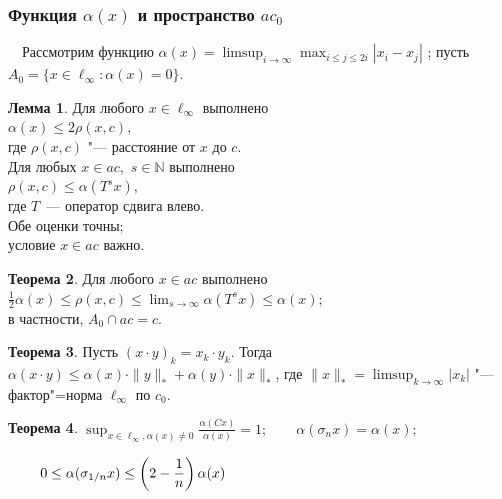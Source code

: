 \documentclass[10pt,pdf,hyperref={unicode},aspectratio=169,color={usenames, dvipsnames}]{beamer}
\theoremstyle{definition}
\newtheorem{llemma}{Лемма}
\newtheorem{ttheorem}[llemma]{Теорема}
\begin{document}
\begin{frame}
	\frametitle{Функция $\alpha(x)$ и пространство $ac_0$}

	\vspace{0.9em}
	~~Рассмотрим функцию
	$\displaystyle
		\alpha(x) = \limsup_{i\to\infty} \max_{i \leq j \leq 2i} |x_i-x_j|
	$
	; пусть
	$
		A_0 = \{x\in\ell_\infty : \alpha(x) = 0\}
	$.


	\begin{varwidth}[t]{0.47\linewidth}
		\begin{llemma}
			Для любого $x\in\ell_\infty$
			выполнено
			\\\phantom{centering}
			$
				\alpha(x) \leq 2\rho(x, c)
			$,
			\\
			где $\rho(x,c)$ "--- расстояние от $x$ до $c$.
			\\
			Для любых $x\in ac$,~$s\in\mathbb{N}$ выполнено
			\\\phantom{centering}
			$
				\rho(x,c)\leq \alpha(T^s x)
			$,
			\\
			где $T$~--- оператор сдвига влево.%
			\\
			Обе оценки точны;
			\\
			условие $x\in ac$ важно.
		\end{llemma}

		\begin{ttheorem}
			Для любого $x\in ac$ выполнено\\
			$\displaystyle
				\frac{1}{2} \alpha(x) \leq \rho(x,c)\leq \lim_{s\to\infty} \alpha(T^s x) \leq \alpha(x)
				;
			$
			\\
			в частности, $A_0 \cap ac = c$.
		\end{ttheorem}
	\end{varwidth}
	\hfill
	\begin{varwidth}[t]{0.52\linewidth}
		\begin{ttheorem}
			Пусть $(x\cdot y)_k = x_k\cdot y_k$.
			Тогда
			$\alpha(x\cdot y)\leq \alpha(x)\cdot \|y\|_* + \alpha(y)\cdot \|x\|_*$,
			где
			$\displaystyle\|x\|_* = \limsup_{k\to\infty} |x_k|$
			"--- фактор"=норма $\ell_\infty$ по $c_0$.
		\end{ttheorem}
		\begin{ttheorem}
			$\displaystyle
				\sup_{x\in\ell_\infty, \alpha(x)\neq 0} \frac{\alpha(Cx)}{\alpha(x)}=1
				;
				\qquad
				\alpha(\sigma_n x) = \alpha(x);
			$

			\vspace{-0.3em}
			$\displaystyle
				\phantom{.}\hfill
				\qquad
				0\leq \alpha(\sigma_{1/n} x) \leq \left( 2- \frac{1}{n} \right) \alpha(x)
			$
		\end{ttheorem}
	\end{varwidth}


\end{frame}
\end{document}
